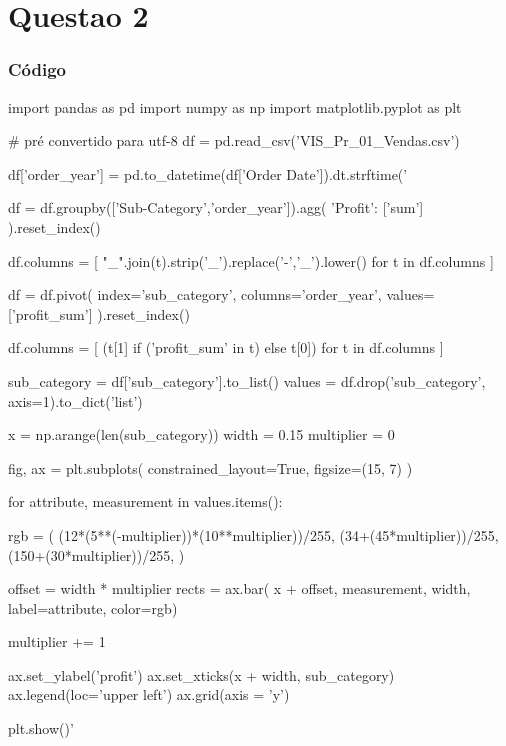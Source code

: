 \chapter{Questao 2}

\subsection*{Código}

\begin{python}
import pandas as pd
import numpy as np
import matplotlib.pyplot as plt

# pré convertido para utf-8
df = pd.read_csv('VIS_Pr_01_Vendas.csv')

df['order_year'] = pd.to_datetime(df['Order Date']).dt.strftime('%

df = df.groupby(['Sub-Category','order_year']).agg(
    {'Profit': ['sum']}
).reset_index()

df.columns = [
    "_".join(t).strip('_').replace('-','_').lower()
    for t in df.columns
]

df = df.pivot(
    index='sub_category',
    columns='order_year',
    values=['profit_sum']
).reset_index()

df.columns = [
    (t[1] if ('profit_sum' in t) else t[0])
    for t in df.columns
]

sub_category = df['sub_category'].to_list()
values = df.drop('sub_category', axis=1).to_dict('list')


x = np.arange(len(sub_category))
width = 0.15
multiplier = 0

fig, ax = plt.subplots(
    constrained_layout=True,
    figsize=(15, 7)
)

for attribute, measurement in values.items():
    
    rgb = (
        (12*(5**(-multiplier))*(10**multiplier))/255,
        (34+(45*multiplier))/255,
        (150+(30*multiplier))/255,
    )    
    
    offset = width * multiplier
    rects = ax.bar(
        x + offset,
        measurement,
        width,
        label=attribute,
        color=rgb)
        
    multiplier += 1

ax.set_ylabel('profit')
ax.set_xticks(x + width, sub_category)
ax.legend(loc='upper left')
ax.grid(axis = 'y')

plt.show()'
\end{python}


